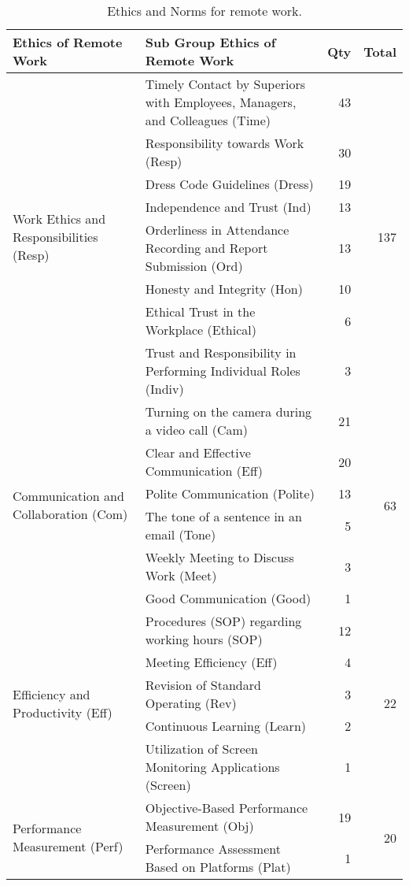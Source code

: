 \documentclass[a4paper, conference]{IEEEtran}
\begin{document}
\begin{table}
	\centering
	\caption{Ethics and Norms for remote work.}
	\label{tab:ethics_for_remote_work}
	\begin{tabular}{|p{}|p{}|r|r|}
		\hline
		\textbf{Ethics of Remote Work} & \textbf{Sub Group Ethics of Remote Work} & \textbf{Qty} & \textbf{Total} \\ \hline
		\multirow{8}{=}{Work Ethics and Responsibilities (Resp)}   
		& Timely Contact by Superiors with Employees, Managers, and Colleagues (Time)  & 43 & \multirow{8}{*}{137} \\ \cline{2-3}
		& Responsibility towards Work (Resp) & 30 & \\ \cline{2-3}
		& Dress Code Guidelines (Dress) & 19 & \\ \cline{2-3}
		& Independence and Trust (Ind) & 13 & \\ \cline{2-3}
		& Orderliness in Attendance Recording and Report Submission (Ord) & 13 & \\ \cline{2-3}
		& Honesty and Integrity (Hon) & 10 & \\ \cline{2-3}
		& Ethical Trust in the Workplace (Ethical) & 6 & \\ \cline{2-3}
		& Trust and Responsibility in Performing Individual Roles (Indiv) & 3 & \\ \hline
		
		\multirow{6}{=}{Communication and Collaboration (Com)}    
		& Turning on the camera during a video call (Cam) & 21 & \multirow{6}{*}{63} \\ \cline{2-3}
		& Clear and Effective Communication (Eff) & 20 & \\ \cline{2-3}
		& Polite Communication (Polite) & 13 & \\ \cline{2-3}
		& The tone of a sentence in an email (Tone) & 5 & \\ \cline{2-3}
		& Weekly Meeting to Discuss Work (Meet) & 3 & \\ \cline{2-3}
		& Good Communication (Good) & 1 & \\ \hline
		
		\multirow{5}{=}{Efficiency and Productivity (Eff)}    
		& Procedures (SOP) regarding working hours (SOP) & 12 & \multirow{5}{*}{22} \\ \cline{2-3}
		& Meeting Efficiency (Eff) & 4 & \\ \cline{2-3}
		& Revision of Standard Operating (Rev) & 3 & \\ \cline{2-3}
		& Continuous Learning (Learn) & 2 & \\ \cline{2-3}
		& Utilization of Screen Monitoring Applications (Screen) & 1 & \\ \hline
		
		\multirow{2}{=}{Performance Measurement (Perf)} 
		& Objective-Based Performance Measurement (Obj) & 19 & \multirow{2}{*}{20} \\ \cline{2-3}
		& Performance Assessment Based on Platforms (Plat) & 1 & \\ \hline
	\end{tabular}
\end{table}
\end{document}

